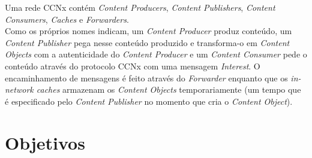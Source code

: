 \documentclass{report}
\begin{document}
Uma rede CCNx contém\cite{introccnx} \textit{Content Producers}, \textit{Content
Publishers}, \textit{Content Consumers}, \textit{Caches} e \textit{Forwarders}.\\

Como os próprios nomes indicam, um \textit{Content Producer} produz conteúdo, um \textit{Content Publisher} pega nesse conteúdo produzido e transforma-o em \textit{Content Objects} com a autenticidade do \textit{Content Producer} e um \textit{Content Consumer} pede o conteúdo através do protocolo CCNx com uma mensagem \textit{Interest}. O encaminhamento de mensagens é feito através do \textit{Forwarder} enquanto que os \textit{in-network caches} armazenam os \textit{Content Objects} temporariamente (um tempo que é especificado pelo \textit{Content Publisher} no momento que cria o \textit{Content Object}).\\

\section{Objetivos}
\end{document}
